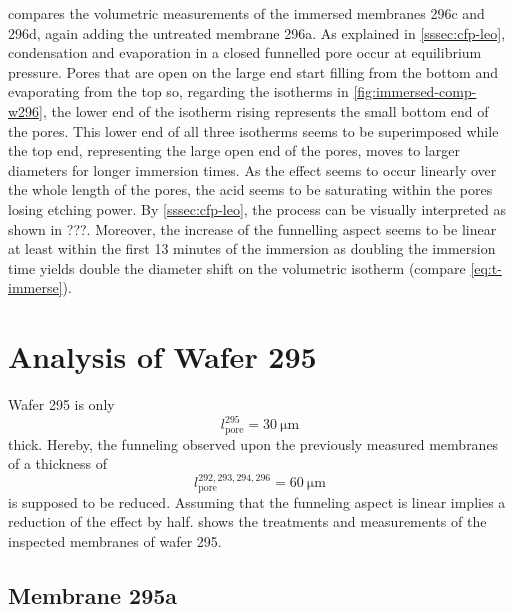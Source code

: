 \documentclass[thesis.tex]{subfiles}
\begin{document}
            

             compares the volumetric measurements of the immersed membranes 296c and 296d, again adding the untreated membrane 296a. As explained in \cref{sssec:cfp-leo}, condensation and evaporation in a closed funnelled pore occur at equilibrium pressure. Pores that are open on the large end start filling from the bottom and evaporating from the top so, regarding the isotherms in \cref{fig:immersed-comp-w296}, the lower end of the isotherm rising represents the small bottom end of the pores. This lower end of all three isotherms seems to be superimposed while the top end, representing the large open end of the pores, moves to larger diameters for longer immersion times. As the effect seems to occur linearly over the whole length of the pores, the acid seems to be saturating within the pores losing etching power. By \cref{sssec:cfp-leo}, the process can be visually interpreted as shown in ???. Moreover, the increase of the funnelling aspect seems to be linear at least within the first 13 minutes of the immersion as doubling the immersion time yields double the diameter shift on the volumetric isotherm (compare \cref{eq:t-immerse}).

            


    \section{Analysis of Wafer 295}
    \label{sec:wafer295}

        Wafer 295 is only
        \begin{equation}
            l^{295}_\mathrm{pore}=\SI{30}{\micro\meter}
        \end{equation}
        thick. Hereby, the funneling observed upon the previously measured membranes of a thickness of
        \begin{equation}
            l^{292,293,294,296}_\mathrm{pore}=\SI{60}{\micro\meter}
        \end{equation}
        is supposed to be reduced. Assuming that the funneling aspect is linear implies a reduction of the effect by half.  shows the treatments and measurements of the inspected membranes of wafer 295.

        

        \subsection{Membrane 295a}
\end{document}
